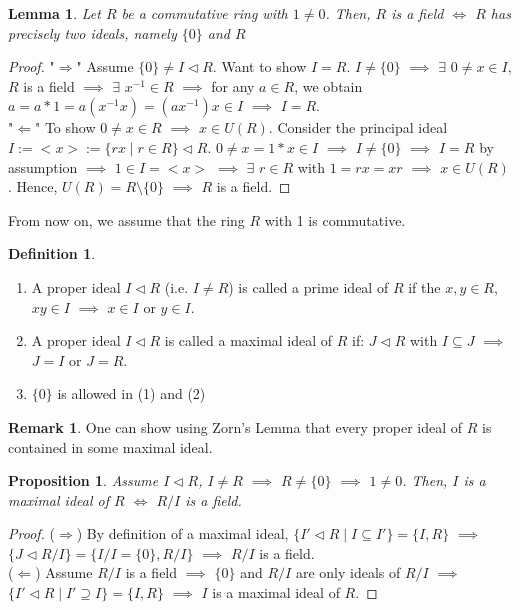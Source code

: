 \documentclass[11pt]{article}
\newtheorem{prop}[thm]{Proposition}
\newtheorem{lem}[thm]{Lemma}
\theoremstyle{definition}
\newtheorem{definition}[thm]{Definition}
\newtheorem{remark}[thm]{Remark}
\numberwithin{equation}{section}
\begin{document}
\begin{lem}
Let $R$ be a commutative ring with $1 \neq 0$. Then, $R$ is a field $\Leftrightarrow$ $R$ has precisely two ideals, namely $\{0\}$ and $R$
\end{lem}

\begin{proof}
"$\Rightarrow$" Assume $\{0\} \neq I \vartriangleleft R$. Want to show $I = R$. $I \neq \{0\}$ $\implies$ $\exists$ $0 \neq x \in I$, $R$ is a field $\implies$ $\exists$ $x^{-1} \in R$ $\implies$ for any $a \in R$, we obtain $a = a*1 = a(x^{-1}x) = (ax^{-1})x \in I$ $\implies$ $ I = R$.\\
"$\Leftarrow$" To show $0 \neq x \in R$ $\implies$ $x \in U(R)$. Consider the principal ideal $I:=<x>:=\{rx \mid r \in R\} \vartriangleleft R$. $0 \neq x = 1*x \in I$ $\implies$ $I \neq \{0\}$ $\implies$ $I = R$ by assumption $\implies$ $1 \in I = <x>$ $\implies$ $\exists$ $r \in R$ with $1 = rx = xr$ $\implies$ $x \in U(R)$. Hence, $U(R) = R \setminus \{0\}$ $\implies$ $R$ is a field.
\end{proof}

From now on, we assume that the ring $R$ with 1 is commutative.

\begin{definition}
\begin{enumerate}
    \item A proper ideal $I \vartriangleleft R$ (i.e. $I \neq R$) is called a prime ideal of $R$ if the $x, y \in R$, $xy \in I$ $\implies$ $x \in I$ or $y \in I$.
    \item A proper ideal $I \vartriangleleft R$ is called a maximal ideal of $R$ if: $J \vartriangleleft R$ with $I \subseteq J$ $\implies$ $J = I$ or $J = R$.
    \item $\{0\}$ is allowed in (1) and (2)
\end{enumerate}
\end{definition}

\begin{remark}
One can show using Zorn's Lemma that every proper ideal of $R$ is contained in some maximal ideal.
\end{remark}

\begin{prop}
Assume $I \vartriangleleft R$, $I \neq R$ $\implies$ $R \neq \{0\}$ $\implies$ $1 \neq 0$. Then, $I$ is a maximal ideal of $R$ $\Leftrightarrow$ $R/I$ is a field.
\end{prop}

\begin{proof}
($\Rightarrow$) By definition of a maximal ideal, $\{I' \vartriangleleft R \mid I \subseteq I'\} = \{I, R\}$ $\implies$ $\{J \vartriangleleft R/I\} = \{I/I = \{0\}, R/I\}$ $\implies$ $R/I$ is a field.\\
($\Leftarrow$) Assume $R/I$ is a field $\implies$ $\{0\}$ and $R/I$ are only ideals of $R/I$ $\implies$ $\{I' \vartriangleleft R \mid I' \supseteq I\} = \{I, R\}$ $\implies$ $I$ is a maximal ideal of $R$.
\end{proof}
\end{document}
